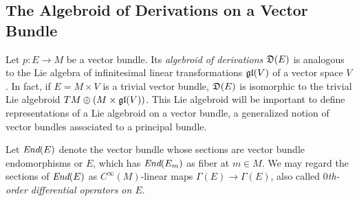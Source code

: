 

\subsection{The Algebroid of Derivations on a Vector Bundle} \label{subsectionDerivationsAlgebroid}




Let $p: E \to M$ be a vector bundle. Its \emph{algebroid of derivations} $\mathfrak{D}(E)$ is analogous to the Lie algebra of infinitesimal linear transformations $\mathfrak{gl}(V)$ of a vector space $V$. In fact, if $E = M \times V$ is a trivial vector bundle, $\mathfrak{D}(E)$ is isomorphic to the trivial Lie algebroid $TM \oplus (M \times \mathfrak{gl}(V))$. This Lie algebroid will be important to define representations of a Lie algebroid on a vector bundle, a generalized notion of vector bundles associated to a principal bundle.

Let $\operatorname{\textit{End}}(E)$ denote the vector bundle whose sections are vector bundle endomorphisms or $E$, which has $\operatorname{\textit{End}}(E_m)$ as fiber at $m \in M$. We may regard the sections of $\operatorname{\textit{End}}(E)$ as $C^\infty(M)$-linear maps $\Gamma(E) \to \Gamma(E)$, also called \emph{$0$th-order differential operators on $E$}.

